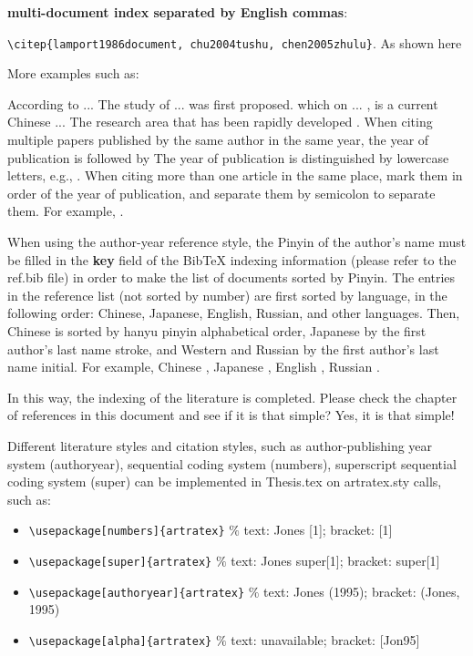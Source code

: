\textbf{multi-document index separated by English commas}:

\verb|\citep{lamport1986document, chu2004tushu, chen2005zhulu}|. As shown here \citep{lamport1986document,chu2004tushu,chen2005zhulu}

More examples such as:

\citet{walls2013drought}According to ... The study of ... was first proposed. which on ... \citep{walls2013drought}, is a current Chinese ... The research area that has been rapidly developed \citep{chen1980zhongguo}. When citing multiple papers published by the same author in the same year, the year of publication is followed by
The year of publication is distinguished by lowercase letters, e.g., \citep{yuan2012lana,yuan2012lanb,yuan2012lanc}. When citing more than one article in the same place, mark them in order of the year of publication, and separate them by
semicolon to separate them. For example, \citep{chen1980zhongguo,stamerjohanns2009mathml,hls2012jinji,niu2013zonghe}.

When using the author-year reference style, the Pinyin of the author's name must be filled in the \textbf{key} field of the BibTeX indexing information (please refer to the ref.bib file) in order to make the list of documents sorted by Pinyin. The entries in the reference list (not sorted by number) are first sorted by language, in the following order: Chinese, Japanese, English, Russian, and other languages. Then, Chinese is sorted by hanyu pinyin alphabetical order, Japanese by the first author's last name stroke, and Western and Russian by the first author's last name initial. For example, Chinese \cite{niu2013zonghe}, Japanese \cite{Bohan1928}, English \cite{stamerjohanns2009mathml}, Russian \cite{Dubrovin1906}.

In this way, the indexing of the literature is completed. Please check the chapter of references in this document and see if it is that simple? Yes, it is that simple!

Different literature styles and citation styles, such as author-publishing year system (authoryear), sequential coding system (numbers), superscript sequential coding system (super) can be implemented in Thesis.tex on artratex.sty calls, such as:
\begin{itemize}
    \footnotesize
    \item \verb+\usepackage[numbers]{artratex}+ $\%$ text: Jones [1]; bracket: [1]
    \item \verb+\usepackage[super]{artratex}+ $\%$ text: Jones super[1]; bracket: super[1]
    \item \verb+\usepackage[authoryear]{artratex}+ $\%$ text: Jones (1995); bracket: (Jones, 1995)
    \item \verb+\usepackage[alpha]{artratex}+ $\%$ text: unavailable; bracket: [Jon95]
\end{itemize}

